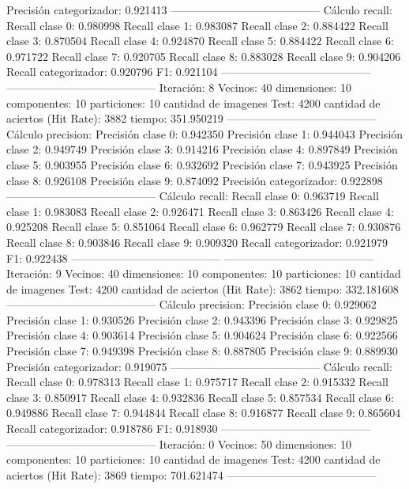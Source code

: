 Precisión categorizador: 0.921413
-----------------------------------------
Cálculo recall: 
Recall clase 0: 0.980998
Recall clase 1: 0.983087
Recall clase 2: 0.884422
Recall clase 3: 0.870504
Recall clase 4: 0.924870
Recall clase 5: 0.884422
Recall clase 6: 0.971722
Recall clase 7: 0.920705
Recall clase 8: 0.883028
Recall clase 9: 0.904206
Recall categorizador: 0.920796
F1: 0.921104
-----------------------------------------
-----------------------------------------
Iteración: 8
Vecinos: 40
dimensiones: 10
componentes: 10
particiones: 10
cantidad de imagenes Test: 4200
cantidad de aciertos (Hit Rate): 3882
tiempo: 351.950219
-----------------------------------------
Cálculo precision: 
Precisión clase 0: 0.942350
Precisión clase 1: 0.944043
Precisión clase 2: 0.949749
Precisión clase 3: 0.914216
Precisión clase 4: 0.897849
Precisión clase 5: 0.903955
Precisión clase 6: 0.932692
Precisión clase 7: 0.943925
Precisión clase 8: 0.926108
Precisión clase 9: 0.874092
Precisión categorizador: 0.922898
-----------------------------------------
Cálculo recall: 
Recall clase 0: 0.963719
Recall clase 1: 0.983083
Recall clase 2: 0.926471
Recall clase 3: 0.863426
Recall clase 4: 0.925208
Recall clase 5: 0.851064
Recall clase 6: 0.962779
Recall clase 7: 0.930876
Recall clase 8: 0.903846
Recall clase 9: 0.909320
Recall categorizador: 0.921979
F1: 0.922438
-----------------------------------------
-----------------------------------------
Iteración: 9
Vecinos: 40
dimensiones: 10
componentes: 10
particiones: 10
cantidad de imagenes Test: 4200
cantidad de aciertos (Hit Rate): 3862
tiempo: 332.181608
-----------------------------------------
Cálculo precision: 
Precisión clase 0: 0.929062
Precisión clase 1: 0.930526
Precisión clase 2: 0.943396
Precisión clase 3: 0.929825
Precisión clase 4: 0.903614
Precisión clase 5: 0.904624
Precisión clase 6: 0.922566
Precisión clase 7: 0.949398
Precisión clase 8: 0.887805
Precisión clase 9: 0.889930
Precisión categorizador: 0.919075
-----------------------------------------
Cálculo recall: 
Recall clase 0: 0.978313
Recall clase 1: 0.975717
Recall clase 2: 0.915332
Recall clase 3: 0.850917
Recall clase 4: 0.932836
Recall clase 5: 0.857534
Recall clase 6: 0.949886
Recall clase 7: 0.944844
Recall clase 8: 0.916877
Recall clase 9: 0.865604
Recall categorizador: 0.918786
F1: 0.918930
-----------------------------------------
-----------------------------------------
Iteración: 0
Vecinos: 50
dimensiones: 10
componentes: 10
particiones: 10
cantidad de imagenes Test: 4200
cantidad de aciertos (Hit Rate): 3869
tiempo: 701.621474
-----------------------------------------
